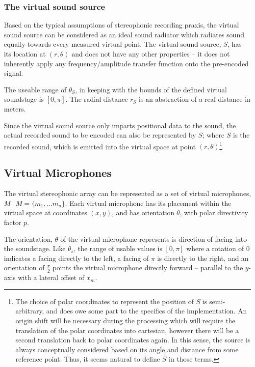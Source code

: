 \subsubsection{The virtual sound source}

Based on the typical assumptions of stereophonic recording praxis, the virtual sound source can be considered as an ideal sound radiator which radiates sound equally towards every measured virtual point. The virtual sound source, $S$, has its location at $(r, \theta)$ and does not have any other properties -- it does not inherently apply any frequency/amplitude transfer function onto the pre-encoded signal.

The useable range of $\theta_S$, in keeping with the bounds of the defined virtual soundstage is $[0, \pi]$. The radial distance $r_S$ is an abstraction of a real distance in meters. 

Since the virtual sound source only imparts positional data to the sound, the actual recorded sound to be encoded can also be represented by $S$; where $S$ is the recorded sound, which is emitted into the virtual space at point $(r, \theta)$\footnote{The choice of polar coordinates to represent the position of $S$ is semi-arbitrary, and does owe some part to the specifics of the implementation. An origin shift will be necessary during the processing which will require the translation of the polar coordinates into cartesian, however there will be a second translation back to polar coordinates again. In this sense, the source is always conceptually considered based on its angle and distance from some reference point. Thus, it seems natural to define $S$ in those terms.}

\subsection{Virtual Microphones}

The virtual stereophonic array can be represented as a set of virtual microphones, $M \: | \: M = \{m_1, ... m_n\}$. Each virtual microphone has its placement within the virtual space at coordinates $(x,y)$, and has orientation $\theta$, with polar directivity factor $p$.

The orientation, $\theta$ of the virtual microphone represents is direction of facing into the soundstage. Like $\theta_s$, the range of usable values is $[0, \pi]$ where a rotation of $0$ indicates a facing directly to the left, a facing of $\pi$ is directly to the right, and an orientation of $\frac{\pi}{2}$ points the virtual microphone directly forward -- parallel to the $y$-axis with a lateral offset of $x_m$.

